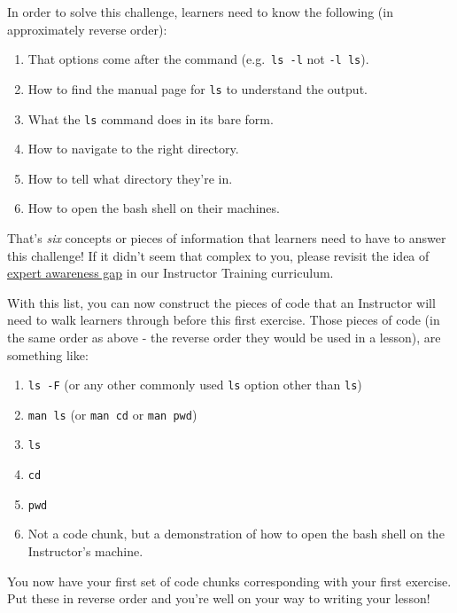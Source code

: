 \documentclass[
]{book}
\providecommand{\tightlist}{%
  \setlength{\itemsep}{0pt}\setlength{\parskip}{0pt}}
\begin{document}
In order to solve this challenge, learners need to know the following (in approximately reverse order):

\begin{enumerate}
\def\labelenumi{\arabic{enumi}.}
\tightlist
\item
  That options come after the command (e.g.~\texttt{ls\ -l} not \texttt{-l\ ls}).
\item
  How to find the manual page for \texttt{ls} to understand the output.
\item
  What the \texttt{ls} command does in its bare form.
\item
  How to navigate to the right directory.
\item
  How to tell what directory they're in.
\item
  How to open the bash shell on their machines.
\end{enumerate}

That's \emph{six} concepts or pieces of information that learners need to have to answer this challenge! If it
didn't seem that complex to you, please revisit the idea of
\href{https://carpentries.github.io/instructor-training/03-expertise/index.html\#expertise-and-teaching}{expert awareness gap} in our Instructor Training
curriculum.

With this list, you can now construct the pieces of code that an Instructor will need to walk learners through
before this first exercise. Those pieces of code (in the same order as above - the reverse order they would
be used in a lesson), are something like:

\begin{enumerate}
\def\labelenumi{\arabic{enumi}.}
\tightlist
\item
  \texttt{ls\ -F} (or any other commonly used \texttt{ls} option other than \texttt{ls})
\item
  \texttt{man\ ls} (or \texttt{man\ cd} or \texttt{man\ pwd})
\item
  \texttt{ls}
\item
  \texttt{cd}
\item
  \texttt{pwd}
\item
  Not a code chunk, but a demonstration of how to open the bash shell on the Instructor's machine.
\end{enumerate}

You now have your first set of code chunks corresponding with your first exercise. Put these in reverse order
and you're well on your way to writing your lesson!
\end{document}
